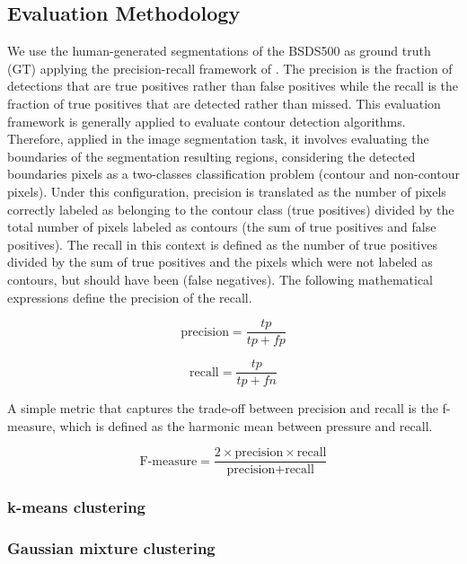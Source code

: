 \subsection{Evaluation Methodology}
We use the human-generated segmentations of the BSDS500 as ground truth (GT) applying the precision-recall framework of \cite{Martin.Fowlkes.ea:PAMI:2004}. The precision is the fraction of detections that are true positives rather than false positives while the recall is the fraction of true positives that are detected rather than missed. This evaluation framework is generally applied to evaluate contour detection algorithms. Therefore, applied in the image segmentation task, it involves evaluating the boundaries of the segmentation resulting regions, considering the detected boundaries pixels as a two-classes classification problem (contour and non-contour pixels). Under this configuration, precision is translated as the number of pixels correctly labeled as belonging to the contour class (true positives) divided by the total number of pixels labeled as contours (the sum of true positives and false positives). The recall in this context is defined as the number of true positives divided by the sum of true positives and the pixels which were not labeled as contours, but should have been (false negatives). The following mathematical expressions define the precision of the recall. 

\begin{equation}\label{eq:precision_score}
    \text{precision} = \frac{tp}{tp+fp}
\end{equation}

\begin{equation}\label{eq:recall_score}
    \text{recall} = \frac{tp}{tp+fn}
\end{equation}

A simple metric that captures the trade-off between precision and recall is the f-measure, which is defined as the harmonic mean between pressure and recall.

\begin{equation}\label{eq:f_score}
    \text{F-measure} = \frac{2 \times \text{precision}\times\text{recall}}{\text{precision} + \text{recall}}
\end{equation}


\subsubsection{k-means clustering}
\subsubsection{Gaussian mixture clustering}
